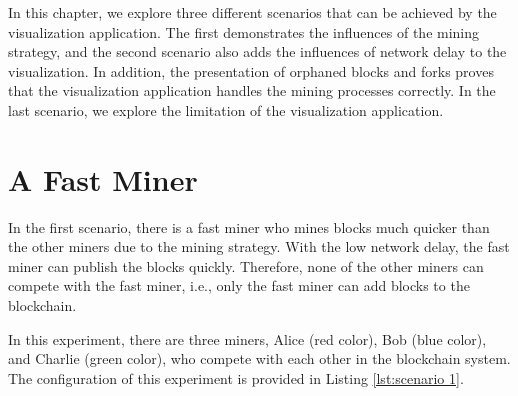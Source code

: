 In this chapter, we explore three different scenarios that can be achieved by the visualization application. The first demonstrates the influences of the mining strategy, and the second scenario also adds the influences of network delay to the visualization. In addition, the presentation of orphaned blocks and forks proves that the visualization application handles the mining processes correctly. In the last scenario, we explore the limitation of the visualization application.

\section{A Fast Miner}

In the first scenario, there is a fast miner who mines blocks much quicker than the other miners due to the mining strategy. With the low network delay, the fast miner can publish the blocks quickly. Therefore, none of the other miners can compete with the fast miner, i.e., only the fast miner can add blocks to the blockchain.

In this experiment, there are three miners, Alice (red color), Bob (blue color), and Charlie (green color), who compete with each other in the blockchain system. The configuration of this experiment is provided in Listing \ref{lst:scenario 1}.

